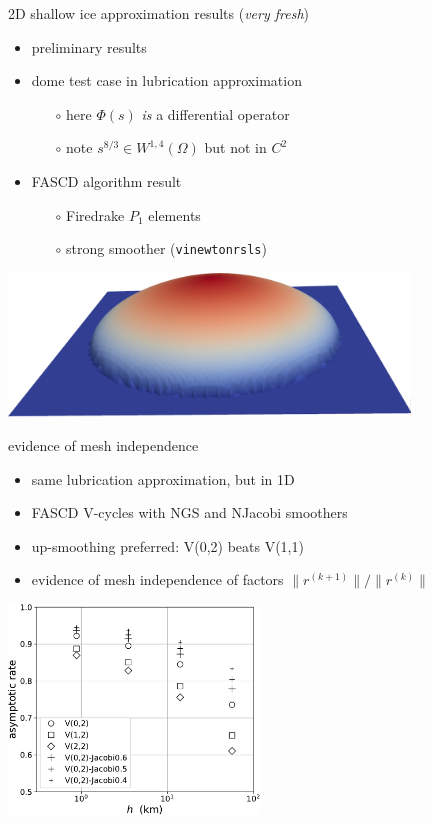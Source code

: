 \documentclass[svgnames,
               hyperref={colorlinks,citecolor=DeepPink4,linkcolor=FireBrick,urlcolor=Maroon},
               usepdftitle=false]  %
               {beamer}
\begin{document}
\begin{frame}{2D shallow ice approximation results (\emph{very fresh})}

\begin{itemize}
\item preliminary results
\item dome test case in lubrication approximation
    \begin{itemize}
    \item[$\circ$] here $\Phi(s)$ \emph{is} a differential operator
    \item[$\circ$] note $s^{8/3} \in W^{1,4}(\Omega)$ but not in $C^2$
    \end{itemize}
\item FASCD algorithm result
    \begin{itemize}
    \item[$\circ$] Firedrake $P_1$ elements
    \item[$\circ$] strong smoother (\texttt{vinewtonrsls})
    \end{itemize}
\end{itemize}

\medskip
\begin{center}
\includegraphics[width=0.8\textwidth]{images/fascd-firedrake-dome.png}
\end{center}
\end{frame}


\begin{frame}{evidence of mesh independence}

\begin{itemize}
\item same lubrication approximation, but in 1D
\item FASCD V-cycles with NGS and NJacobi smoothers
\item up-smoothing preferred: V(0,2) beats V(1,1)
\item evidence of mesh independence of factors $\|r^{(k+1)}\| / \|r^{(k)}\|$
\end{itemize}

\begin{center}
\includegraphics[width=0.5\textwidth]{images/sia-asymprates.pdf}
\end{center}
\end{frame}
\end{document}
